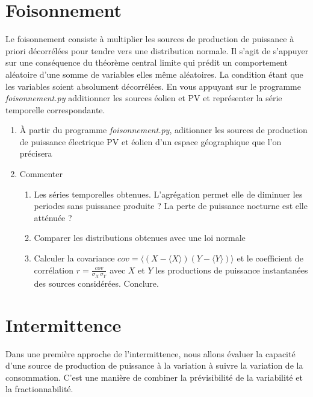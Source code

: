 \documentclass[12pt,a4]{article}
\newcommand{\tmtextit}[1]{{\itshape{#1}}}
\begin{document}
\section{Foisonnement}

Le foisonnement consiste à multiplier les sources de production de puissance
à priori décorrélées pour tendre vers une distribution normale. Il s'agit de s'appuyer sur une conséquence du théorème central limite qui prédit un
comportement aléatoire d'une somme de variables elles même aléatoires. La
condition étant que les variables soient absolument décorrélées. En vous
appuyant sur le programme \tmtextit{foisonnement.py} additionner les sources
éolien et PV et représenter la série temporelle correspondante.

\begin{enumerate}
  \item À partir du programme \tmtextit{foisonnement.py}, aditionner les
  sources de production de puissance électrique PV et éolien d'un espace géographique que l'on précisera 
  
  \item Commenter
  \begin{enumerate}
    \item Les séries temporelles obtenues. L'agrégation permet elle de
    diminuer les periodes sans puissance produite ? La perte de puissance
    nocturne est elle atténuée ?
    
    \item Comparer les distributions obtenues avec une loi normale
    
    \item Calculer la covariance $cov=\langle (X-\langle X \rangle)(Y - \langle Y \rangle)\rangle $ et le coefficient de corrélation $r=\frac{cov}{\sigma_X \, \sigma_Y}$ avec $X$ et $Y$ les productions de puissance instantanées des sources considérées. Conclure.
    
  \end{enumerate}
\end{enumerate}

\section{Intermittence}

Dans une première approche de l'intermittence, nous allons évaluer la
capacité d'une source de production de puissance à la variation à suivre la variation de la consommation. C'est une manière de combiner la prévisibilité de la variabilité et la fractionnabilité.
\end{document}
